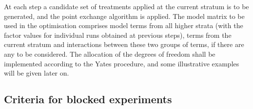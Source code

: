 At each step a candidate set of treatments applied at the current stratum is to be generated, and the point exchange algorithm is applied. The model matrix to be used in the optimisation comprises model terms from all higher strata (with the factor values for individual runs obtained at previous steps), terms from the current stratum and interactions between these two groups of terms, if there are any to be considered. The allocation of the degrees of freedom shall be implemented according to the Yates procedure, and some illustrative examples will be given later on.

\subsection*{Criteria for blocked experiments}
\label{subsec::compound_blocked}


